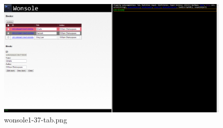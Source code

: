 \clearpage
\begin{figure}
\includegraphics[width=\textwidth]{screenshot/wonsole1-37-tab.png}
\caption{wonsole1-37-tab.png}
\label{wonsole1-37-tab.png}
\end{figure}


